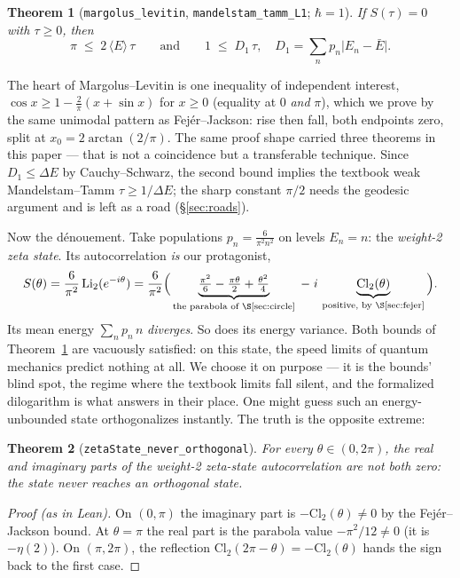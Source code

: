 \documentclass[11pt]{article}
\newtheorem{theorem}{Theorem}
\newcommand{\lean}[1]{\texttt{#1}}
\newcommand{\Li}{\mathrm{Li}_2}
\newcommand{\Cl}{\mathrm{Cl}_2}
\begin{document}
\begin{theorem}[{\lean{margolus\_levitin}, \lean{mandelstam\_tamm\_L1}}; $\hbar=1$]
\label{thm:qsl}
If $S(\tau)=0$ with $\tau\ge0$, then
\[
\pi \;\le\; 2\,\langle E\rangle\,\tau
\qquad\text{and}\qquad
1 \;\le\; D_1\,\tau,
\quad D_1=\textstyle\sum_n p_n\lvert E_n-\bar E\rvert .
\]
\end{theorem}

The heart of Margolus--Levitin is one inequality of independent interest,
$\cos x\ge 1-\tfrac{2}{\pi}(x+\sin x)$ for $x\ge0$ (equality at $0$ \emph{and} $\pi$),
which we prove by the same unimodal pattern as Fej\'er--Jackson: rise then fall, both
endpoints zero, split at $x_0=2\arctan(2/\pi)$. The same proof shape carried three
theorems in this paper --- that is not a coincidence but a transferable technique.
Since $D_1\le\Delta E$ by Cauchy--Schwarz, the second bound implies the textbook weak
Mandelstam--Tamm $\tau\ge1/\Delta E$; the sharp constant $\pi/2$ needs the geodesic
argument and is left as a road (\S\ref{sec:roads}).

Now the d\'enouement. Take populations $p_n=\frac{6}{\pi^2 n^2}$ on levels $E_n=n$: the
\emph{weight-2 zeta state}. Its autocorrelation \emph{is} our protagonist,
\[
S(\theta)=\frac{6}{\pi^2}\,\Li(e^{-i\theta})
=\frac{6}{\pi^2}\Big(
\underbrace{\tfrac{\pi^2}{6}-\tfrac{\pi\theta}{2}+\tfrac{\theta^2}{4}}_{\text{the
parabola of \S\ref{sec:circle}}}
\;-\;i\,\underbrace{\Cl(\theta)}_{\text{positive, by \S\ref{sec:fejer}}}\Big).
\]
Its mean energy $\sum_n p_n\,n$ \emph{diverges}. So does its energy variance. Both
bounds of Theorem~\ref{thm:qsl} are vacuously satisfied: on this state, the speed
limits of quantum mechanics predict nothing at all. We choose it on purpose --- it is
the bounds' blind spot, the regime where the textbook limits fall silent, and the
formalized dilogarithm is what answers in their place. One might guess such an
energy-unbounded state orthogonalizes instantly. The truth is the opposite extreme:

\begin{theorem}[{\lean{zetaState\_never\_orthogonal}}]\label{thm:clock}
For every $\theta\in(0,2\pi)$, the real and imaginary parts of the weight-2 zeta-state
autocorrelation are not both zero: the state \emph{never} reaches an orthogonal state.
\end{theorem}

\begin{proof}[Proof (as in Lean)]
On $(0,\pi)$ the imaginary part is $-\Cl(\theta)\ne0$ by the Fej\'er--Jackson bound. At
$\theta=\pi$ the real part is the parabola value $-\pi^2/12\ne0$ (it is $-\eta(2)$). On
$(\pi,2\pi)$, the reflection $\Cl(2\pi-\theta)=-\Cl(\theta)$ hands the sign back to the
first case.
\end{proof}
\end{document}
